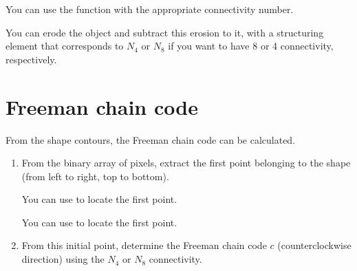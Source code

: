 \begin{mcomment}
 \begin{mhelp}
  You can use the function  with the appropriate connectivity number.
 \end{mhelp}

\end{mcomment}

\begin{pcomment}
 \begin{phelp}
  You can erode the object and subtract this erosion to it, with a structuring element that corresponds to $N_4$ or $N_8$ if you want to have 8 or 4 connectivity, respectively.
 \end{phelp}

\end{pcomment}


\section{Freeman chain code}
From the shape contours, the Freeman chain code can be calculated.
\begin{qbox}
\begin{enumerate}
	\item From the binary array of pixels, extract the first point belonging to the shape (from left to right, top to bottom).
	
	\begin{pcomment}
	 \begin{phelp}
	  You can use  to locate the first point.
	 \end{phelp}

	\end{pcomment}
	
	\begin{mcomment}
	 \begin{mhelp}
	  You can use  to locate the first point.
	 \end{mhelp}

	\end{mcomment}


	\item From this initial point, determine the Freeman chain code $c$ (counterclockwise direction) using the $N_4$ or $N_8$ connectivity.
\end{enumerate}
\end{qbox}

